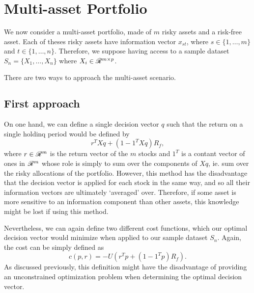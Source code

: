 \section{Multi-asset Portfolio}

We now consider a multi-asset portfolio, made of $m$ risky assets and a risk-free
asset. Each of theses risky assets have information vector $x_{st}$, where
$s\in\{1,\ldots,m\}$ and $t\in\{1,\ldots,n\}$. Therefore, we suppose having access to a
sample dataset $S_n = \{X_1,\ldots,X_n\}$ where $X_i\in\mathscr{R}^{m\times p}$.

There are two ways to approach the multi-asset scenario. 


\subsection{First approach}

On one hand, we can define a single decision vector $q$ such that the return on a single
holdinq period would be defined by
\begin{equation}
  r^{T}Xq + (1 - 1^{T}Xq)R_f,
\end{equation}
where $r\in\mathscr{R}^{m}$ is the return vector of the $m$ stocks and $1^T$ is a contant vector
of ones in $\mathscr{R}^m$ whose role is simply to sum over the components of $Xq$, ie. sum over
the risky allocations of the portfolio. However, this method has the disadvantage that the
decision vector is applied for each stock in the same way, and so all their information
vectors are ultimately `averaged' over. Therefore, if some asset is more sensitive to an
information component than other assets, this knowledge might be lost if using this
method. 

Nevertheless, we can again define two different cost functions, which our optimal decision
vector would minimize when applied to our sample dataset $S_n$. Again, the cost can be
simply defined as
\begin{equation}
  \label{multiCost}
  c(p,r) = -U(r^{T}p + (1 - 1^{T}p)R_f).
\end{equation}
As discussed previously, this definition might have the disadvantage of providing an
unconstrained optimization problem when determining the optimal decision vector.

